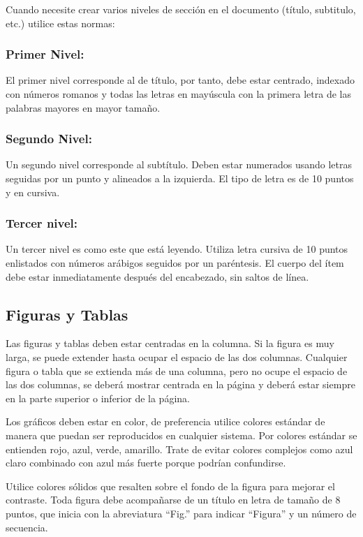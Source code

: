 \documentclass[10pt,twocolumn,letterpaper]{article}
\begin{document}
Cuando necesite crear varios niveles de sección en el documento (título, subtitulo, etc.) utilice estas normas:

\subsubsection{Primer Nivel:}
El primer nivel corresponde al de título, por tanto, debe estar centrado, indexado con números romanos y todas las letras en mayúscula con la primera letra de las palabras mayores en mayor tamaño.

\subsubsection{Segundo Nivel:}
Un segundo nivel corresponde al subtítulo. Deben estar numerados usando letras seguidas por un punto y alineados a la izquierda. El tipo de letra es de 10 puntos y en cursiva.

\subsubsection{Tercer nivel:}
Un tercer nivel es como este que está leyendo. Utiliza letra cursiva de 10 puntos enlistados con números arábigos seguidos por un paréntesis. El cuerpo del ítem debe estar inmediatamente después del encabezado, sin saltos de línea.

\subsection{Figuras y Tablas}
Las figuras y tablas deben estar centradas en la columna. Si la figura es muy larga, se puede extender hasta ocupar el espacio de las dos columnas. Cualquier figura o tabla que se extienda más de una columna, pero no ocupe el espacio de las dos columnas, se deberá mostrar centrada en la página y deberá estar siempre en la parte superior o inferior de la página.

Los gráficos deben estar en color, de preferencia utilice colores estándar de manera que puedan ser reproducidos en cualquier sistema. Por colores estándar se entienden rojo, azul, verde, amarillo. Trate de evitar colores complejos como azul claro combinado con azul más fuerte porque podrían confundirse.

Utilice colores sólidos que resalten sobre el fondo de la figura para mejorar el contraste.
Toda figura debe acompañarse de un título en letra de tamaño de 8 puntos, que inicia con la abreviatura “Fig.” para indicar “Figura” y un número de secuencia.
\end{document}

